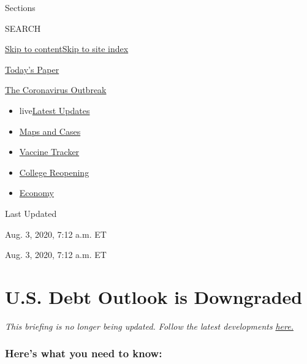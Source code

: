 Sections

SEARCH

\protect\hyperlink{site-content}{Skip to
content}\protect\hyperlink{site-index}{Skip to site index}

\href{https://myaccount.nytimes.com/auth/login?response_type=cookie\&client_id=vi}{}

\href{https://www.nytimes.com/section/todayspaper}{Today's Paper}

\href{https://www.nytimes.com/news-event/coronavirus}{The Coronavirus
Outbreak}

\begin{itemize}
\tightlist
\item
  live\href{https://www.nytimes.com/2020/08/04/world/coronavirus-covid-19.html}{Latest
  Updates}
\item
  \href{https://www.nytimes.com/interactive/2020/us/coronavirus-us-cases.html}{Maps
  and Cases}
\item
  \href{https://www.nytimes.com/interactive/2020/science/coronavirus-vaccine-tracker.html}{Vaccine
  Tracker}
\item
  \href{https://www.nytimes.com/2020/08/02/us/covid-college-reopening.html}{College
  Reopening}
\item
  \href{https://www.nytimes.com/live/2020/08/03/business/stock-market-today-coronavirus}{Economy}
\end{itemize}

Last Updated

Aug. 3, 2020, 7:12 a.m. ET

Aug. 3, 2020, 7:12 a.m. ET

\hypertarget{us-debt-outlook-is-downgraded}{%
\section{U.S. Debt Outlook is
Downgraded}\label{us-debt-outlook-is-downgraded}}

\emph{This briefing is no longer being updated. Follow the latest
developments}
\href{https://www.nytimes.com/live/2020/08/03/business/stock-market-today-coronavirus}{\emph{here.}}

\hypertarget{heres-what-you-need-to-know}{%
\subsubsection{Here's what you need to
know:}\label{heres-what-you-need-to-know}}

